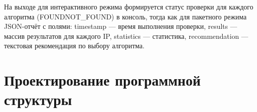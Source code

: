 На выходе для интерактивного режима формируется статус проверки для каждого алгоритма (FOUND\/NOT\_FOUND) в консоль, тогда как для пакетного режима JSON-отчёт с полями: timestamp — время выполнения проверки, results — массив результатов для каждого IP, statistics — статистика, recommendation — текстовая рекомендация по выбору алгоритма.
%
%
%
%
%




\section{Проектирование программной структуры} \label{ch1:sec4}

